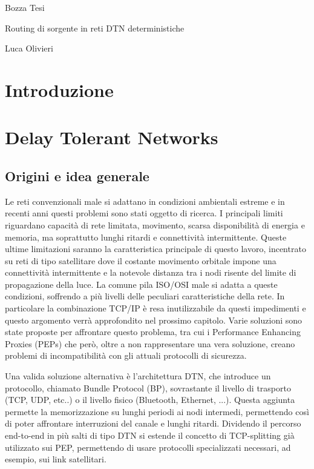 \documentclass[a4paper]{article}
\begin{document}
	\centerline{\sc Bozza Tesi}
	\centerline{\sc \large Routing di sorgente in reti DTN deterministiche}
	\centerline{\sc Luca Olivieri}
	\vspace{2pc}
	
	\tableofcontents
	
	\clearpage
	\section{Introduzione}
	
	\section{Delay Tolerant Networks}
		
		\subsection{Origini e idea generale}
		
		Le reti convenzionali male si adattano in condizioni ambientali estreme e in recenti anni questi problemi sono stati oggetto di ricerca. I principali limiti riguardano capacità di rete limitata, movimento, scarsa disponibilità di energia e memoria, ma soprattutto lunghi ritardi e connettività intermittente. Queste ultime limitazioni saranno la caratteristica principale di questo lavoro, incentrato su reti di tipo satellitare dove il costante movimento orbitale impone una connettività intermittente e la notevole distanza tra i nodi risente del limite di propagazione della luce. La comune pila ISO/OSI male si adatta a queste condizioni, soffrendo a più livelli delle peculiari caratteristiche della rete. In particolare la combinazione TCP/IP è resa inutilizzabile da questi impedimenti e questo argomento verrà approfondito nel prossimo capitolo. Varie soluzioni sono state proposte per affrontare questo problema, tra cui i Performance Enhancing Proxies (PEPs) che però, oltre a non rappresentare una vera soluzione, creano problemi di incompatibilità con gli attuali protocolli di sicurezza.
		
		Una valida soluzione alternativa è l'architettura DTN, che introduce un protocollo, chiamato Bundle Protocol (BP), sovrastante il livello di trasporto (TCP, UDP, etc..) o il livello fisico (Bluetooth, Ethernet, ...). Questa aggiunta permette la memorizzazione su lunghi periodi ai nodi intermedi, permettendo così di poter affrontare interruzioni del canale e lunghi ritardi. Dividendo il percorso end-to-end in più salti di tipo DTN si estende il concetto di TCP-splitting già utilizzato sui PEP, permettendo di usare protocolli specializzati necessari, ad esempio, sui link satellitari.
		
\end{document}
